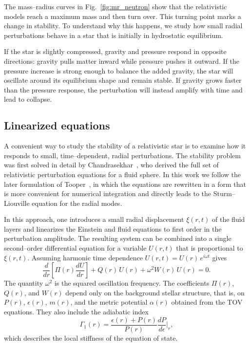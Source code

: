The mass--radius curves in Fig.~\ref{fig:mr_neutron} show that the
relativistic models reach a maximum mass and then turn over.
This turning point marks a change in stability. 
To understand why this happens, we study how small radial
perturbations behave in a star that is initially in hydrostatic
equilibrium.

If the star is slightly compressed, gravity and pressure respond in
opposite directions: gravity pulls matter inward while pressure pushes
it outward. 
If the pressure increase is strong enough to balance the added gravity,
the star will oscillate around its equilibrium shape and remain stable.
If gravity grows faster than the pressure response, the perturbation
will instead amplify with time and lead to collapse.

\subsection*{Linearized equations}

A convenient way to study the stability of a relativistic star is to
examine how it responds to small, time--dependent, radial perturbations.
The stability problem was first solved in detail by
Chandrasekhar~\cite{chandrasekhar1964}, who derived the full set of
relativistic perturbation equations for a fluid sphere.
In this work we follow the later formulation of
Tooper~\cite{tooper1965}, in which the equations are rewritten in a form that is
more convenient for numerical integration and directly leads to the
Sturm--Liouville equation for the radial modes.

In this approach, one introduces a small radial displacement
$\xi(r,t)$ of the fluid layers and linearizes the Einstein and fluid
equations to first order in the perturbation amplitude.
The resulting system can be combined into a single
second--order differential equation for a variable $U(r,t)$ that is
proportional to $\xi(r,t)$.
Assuming harmonic time dependence $U(r,t)=U(r)\,e^{i\omega t}$ gives
\begin{equation}
\frac{d}{dr}\!\left[\Pi(r)\frac{dU}{dr}\right]
+ Q(r)\,U(r) + \omega^2 W(r)\,U(r) = 0.
\label{eq:SL_ideal_NS}
\end{equation}
The quantity $\omega^2$ is the squared oscillation frequency.
The coefficients $\Pi(r)$, $Q(r)$, and $W(r)$ depend only on the
background stellar structure, that is, on $P(r)$, $\epsilon(r)$,
$m(r)$, and the metric potential $\alpha(r)$ obtained from the TOV
equations.
They also include the adiabatic index
\[
\Gamma_1(r) = \frac{\epsilon(r)+P(r)}{P(r)}
\frac{dP}{d\epsilon}\bigg|_{r},
\]
which describes the local stiffness of the equation of state.

